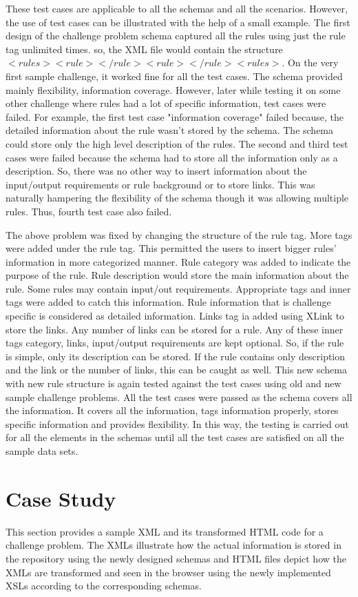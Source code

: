\documentclass[11pt,letterpaper]{report}
\begin{document}
These test cases are applicable to all the schemas and all the scenarios. However, the use of test cases can be illustrated with the help of a small example. The first design of the challenge problem schema captured all the rules using just the rule tag unlimited times. so, the XML file would contain the structure $<rules><rule></rule><rule></rule><rules>$. On the very first sample challenge, it worked fine for all the test cases. The schema provided mainly flexibility, information coverage. However, later while testing it on some other challenge where rules had a lot of specific information, test cases were failed. For example, the first test case "information coverage" failed because, the detailed information about the rule wasn't stored by the schema. The schema could store only the high level description of the rules. The second and third test cases were failed because the schema had to store all the information only as a description. So, there was no other way to insert information about the input/output requirements or rule background or to store links. This was naturally hampering the flexibility of the schema though it was allowing multiple rules. Thus, fourth test case also failed.

The above problem was fixed by changing the structure of the rule tag. More tags were added under the rule tag. This permitted the users to insert bigger rules' information in more categorized manner. Rule category was added to indicate the purpose of the rule. Rule description would store the main information about the rule. Some rules may contain input/out requirements. Appropriate tags and inner tags were added to catch this information. Rule information that is challenge specific is considered as detailed information. Links tag ia added using XLink to store the links. Any number of links can be stored for a rule. Any of these inner tags category, links, input/output requirements are kept optional. So, if the rule is simple, only its description can be stored. If the rule contains only description and the link or the number of links, this can be caught as well. This new schema with new rule structure is again tested against the test cases using old and new sample challenge problems. All the test cases were passed as the schema covers all the information. It covers all the information, tags information properly, stores specific information and provides flexibility. In this way, the testing is carried out for all the elements in the schemas until all the test cases are satisfied on all the sample data sets.    
\section*{Case Study}
This section provides a sample XML and its transformed HTML code for a challenge problem. The XMLs illustrate how the actual information is stored in the repository using the newly designed schemas and HTML files depict how the XMLs are transformed and seen in the browser using the newly implemented XSLs according to the corresponding schemas. 
\end{document}
